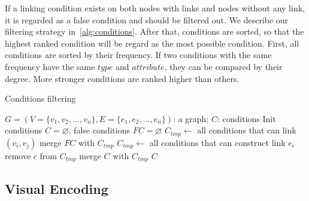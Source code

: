 If a linking condition exists on both nodes with links and nodes without any link, it is regarded as a false condition and should be filtered out.
We describe our filtering strategy in~\ref{alg:conditions}.
After that, conditions are sorted, so that the highest ranked condition will be regard as the most possible condition.
First, all conditions are sorted by their frequency.
If two conditions with the same frequency have the same $type$ and $attribute$, they can be compared by their degree.
More stronger conditions are ranked higher than others.





\begin{algorithm}[!t]
    \renewcommand\arraystretch{1.2}
    \caption{ Conditions filtering }
    \label{alg:conditions}
    \begin{algorithmic}[1]
        \Require
            $G=(V=\{v_1, v_2, ..., v_n\}, E=\{e_1, e_2, ..., e_n\})$: a graph;
        \Ensure
            $C$: conditions
        \State Init conditions $C=\varnothing$, false conditions $FC=\varnothing$
                \State $C_{tmp} \gets$ all conditions that can link $(v_i, v_j)$
                \State merge $FC$ with $C_{tmp}$
            \EndIf
        \EndFor
            \State $C_{tmp} \gets$ all conditions that can construct link $e_i$
                    \State remove $c$ from $C_{tmp}$
                \EndIf
            \EndFor
            \State merge $C$ with $C_{tmp}$
        \EndFor
        \State \Return $C$
    \end{algorithmic}
\end{algorithm}


\subsection{Visual Encoding}
